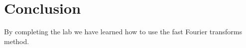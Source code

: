 \documentclass[12pt,a4paper]{article}
\begin{document}
\section{Conclusion}\label{sec:res}
    
    By completing the lab we have learned how to use the fast Fourier transforms method.
 


\end{document}
